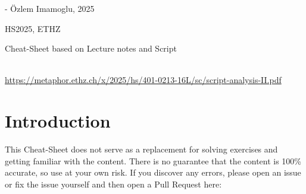 \documentclass{article}
\begin{document}
\maketitle
\usetcolorboxes
{}


\vspace{2cm}
\begin{center}
\end{center}


\vspace{4cm}
\begin{center}
    \begin{Large}
    \end{Large}

    \hspace{3cm} - Özlem Imamoglu, 2025
\end{center}

\vspace{2cm}
\begin{center}
    HS2025, ETHZ\\[0.2cm]
    \begin{Large}
        Cheat-Sheet based on Lecture notes and Script
    \end{Large}\\[0.2cm]

    \url{https://metaphor.ethz.ch/x/2025/hs/401-0213-16L/sc/script-analysis-II.pdf}
\end{center}


\newpage
{}


\newpage
\setcounter{section}{-1}
\section{Introduction}
This Cheat-Sheet does not serve as a replacement for solving exercises and getting familiar with the content.
There is no guarantee that the content is 100\% accurate, so use at your own risk.
If you discover any errors, please open an issue or fix the issue yourself and then open a Pull Request here:
\end{document}
